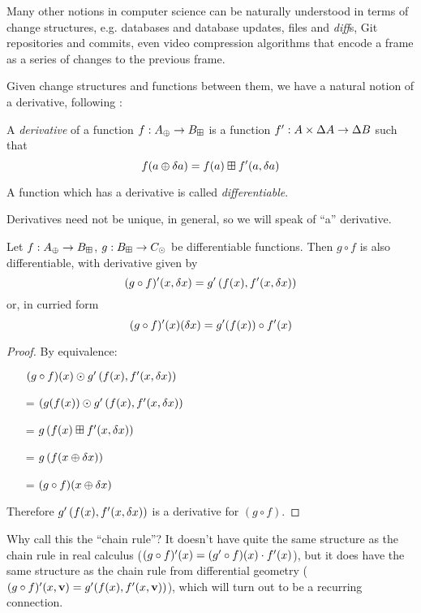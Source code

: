 Many other notions in computer science can be naturally understood in terms of change structures, e.g. databases
and database updates, files and \textit{diff}s, Git repositories and commits, even video compression
algorithms that encode a frame as a series of changes to the previous frame.

Given change structures and functions between them, we have a natural notion of a derivative, following \cite{cai2014changes}:

\begin{defn}[Derivatives]
  A \textit{derivative} of a function $f: A_\oplus \rightarrow B_\boxplus$ is a function $f': A \times \Delta A \rightarrow
  \Delta B$ such that
  $$f(a \oplus \delta a) = f(a) \boxplus f'(a, \delta a)$$

  A function which has a derivative is called \textit{differentiable}.
\end{defn}

Derivatives need not be unique, in general, so we will speak of ``a''
derivative. 

\begin{thm}
  Let $f: A_\oplus \rightarrow B_\boxplus$, $g: B_\boxplus \rightarrow C_\odot$ be differentiable functions. Then $g \circ f$ is also
  differentiable, with derivative given by
   $$(g \circ f)'(x, \delta x) = g'\left(f(x), f'(x, \delta x)\right)$$
   or, in curried form
   $$(g \circ f)'(x)(\delta x) = g'(f(x)) \circ f'(x)$$
\end{thm}
\begin{proof}
  By equivalence:
  \begin{itemize}
    \item[ ]$(g \circ f)(x) \odot g'\left(f(x), f'(x,\delta x)\right)$
    \item[=]$(g(f(x)) \odot g'\left(f(x), f'(x,\delta x)\right)$
    \item[=]$g\left(f(x) \boxplus f'(x, \delta x) \right)$
    \item[=]$g\left(f(x \oplus \delta x)\right)$
    \item[=]$(g \circ f)(x \oplus \delta x)$
  \end{itemize}
  Therefore $g'\left(f(x), f'(x, \delta x)\right)$ is a
  derivative for $(g \circ f)$.
\end{proof}

Why call this the ``chain rule''? It doesn't have quite the same structure as
the chain rule in real calculus ($(g \circ f)'(x) = (g' \circ f)
(x) \cdot f'(x)$), but it does have the same structure as the chain rule
from differential geometry ($(g \circ f)'(x, \textbf{v}) = g'
(f(x), f'(x, \textbf{v}))$), which will turn out to be a recurring
connection. 

